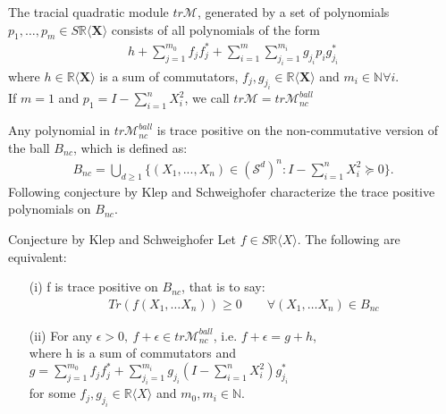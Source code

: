 \documentclass[13.5pt]{beamer}
\begin{document}
\begin{frame}
\begin{definition}
		The tracial quadratic module $tr \mathcal{M}$, generated by a set of polynomials $p_1, \dots, p_m \in S\mathbb{R} \langle \mathbf{X} \rangle$ consists of all polynomials of the form
			\begin{align*}
				h + \sum_{j=1}^{m_0} f_jf_j^* + \sum_{i=1}^m \sum_{j_i=1}^{m_i} g_{j_i} p_i g_{j_i}^*
			\end{align*}
		where $h \in \mathbb{R} \langle \mathbf{X} \rangle$ is a sum of commutators, $f_j, g_{j_i} \in \mathbb{R} \langle \mathbf{X} \rangle$ and $m_i \in \mathbb{N} \forall i$. \\
        \pause
		If $m=1$ and $p_1 = I-\sum_{i=1}^n X_i^2$, we call $tr \mathcal{M} = tr \mathcal{M}^{ball}_{nc}$
	\end{definition}
\end{frame}

\begin{frame}
Any polynomial in $tr \mathcal{M}^{ball}_{nc}$ is trace positive on the non-commutative version of the ball $B_{nc}$, which is defined as:
\begin{align*}
	B_{nc}=\bigcup \limits_{d\geq1} \Biggl\{(X_1,...,X_n) \in (\mathcal{S}^d)^n : I- \sum \limits_{i=1}^n X_i^2 \succeq 0 \Biggr \}.
\end{align*}
\pause
Following conjecture by Klep and Schweighofer characterize the trace positive polynomials on $B_{nc}$.
\end{frame}

\begin{frame}{Conjecture by Klep and Schweighofer}
Let $f \in S\mathbb{R} \langle X \rangle$. The following are equivalent:
	\begin{itemize}
		\item [(i)] f is trace positive on $B_{nc}$, that is to say: 
		\begin{align*}
			Tr(f(X_1, \ldots X_n)) \geq 0  \qquad \forall (X_1,\ldots X_n) \in B_{nc}
		\end{align*}
        \pause
		\item [(ii)] For any $\epsilon > 0,~f+\epsilon \in tr \mathcal{M}_{nc}^{ball}$, i.e. $f+ \epsilon = g+h$, \\ \vspace*{2mm} where h is a sum of commutators and \\ \vspace*{2mm} $g= \sum_{j=1}^{m_0} f_j f_j^* +  \sum_{j_i=1}^{m_i} g_{j_i} (I- \sum_{i=1}^n X_i^2) g_{j_i}^*$ \\ \vspace*{2mm} for some $f_j,g_{j_i} \in \mathbb{R}\langle X \rangle $ and $m_0,m_i \in \mathbb{N}$.
	\end{itemize}

\end{frame}
\end{document}
